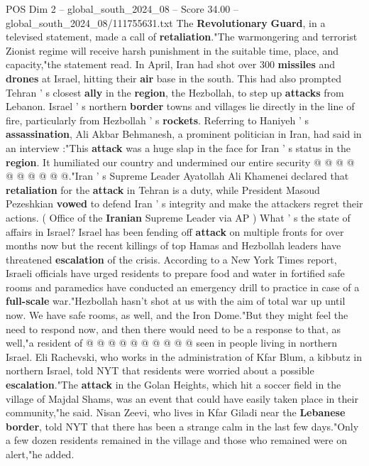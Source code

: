 \begin{textsample}{POS Dim 2 – global\_south\_2024\_08 – Score 34.00 – global\_south\_2024\_08/111755631.txt}
The \textbf{Revolutionary} \textbf{Guard}, in a televised statement, made a call of \textbf{retaliation}."The warmongering and terrorist Zionist regime will receive harsh punishment in the suitable time, place, and capacity,"the statement read.
In April, Iran had shot over 300 \textbf{missiles} and \textbf{drones} at Israel, hitting their \textbf{air} base in the south.
This had also prompted Tehran ' s closest \textbf{ally} in the \textbf{region}, the Hezbollah, to step up \textbf{attacks} from Lebanon.
Israel ' s northern \textbf{border} towns and villages lie directly in the line of fire, particularly from Hezbollah ' s \textbf{rockets}.
Referring to Haniyeh ' s \textbf{assassination}, Ali Akbar Behmanesh, a prominent politician in Iran, had said in an interview :"This \textbf{attack} was a huge slap in the face for Iran ' s status in the \textbf{region}.
It humiliated our country and undermined our entire security @ @ @ @ @ @ @ @ @ @."Iran ' s Supreme Leader Ayatollah Ali Khamenei declared that \textbf{retaliation} for the \textbf{attack} in Tehran is a duty, while President Masoud Pezeshkian \textbf{vowed} to defend Iran ' s integrity and make the attackers regret their actions. ( Office of the \textbf{Iranian} Supreme Leader via AP ) What ' s the state of affairs in Israel?
Israel has been fending off \textbf{attack} on multiple fronts for over months now but the recent killings of top Hamas and Hezbollah leaders have threatened \textbf{escalation} of the crisis.
According to a New York Times report, Israeli officials have urged residents to prepare food and water in fortified safe rooms and paramedics have conducted an emergency drill to practice in case of a \textbf{full-scale} war."Hezbollah hasn't shot at us with the aim of total war up until now.
We have safe rooms, as well, and the Iron Dome."But they might feel the need to respond now, and then there would need to be a response to that, as well,"a resident of @ @ @ @ @ @ @ @ @ @ seen in people living in northern Israel.
Eli Rachevski, who works in the administration of Kfar Blum, a kibbutz in northern Israel, told NYT that residents were worried about a possible \textbf{escalation}."The \textbf{attack} in the Golan Heights, which hit a soccer field in the village of Majdal Shams, was an event that could have easily taken place in their community,"he said.
Nisan Zeevi, who lives in Kfar Giladi near the \textbf{Lebanese} \textbf{border}, told NYT that there has been a strange calm in the last few days."Only a few dozen residents remained in the village and those who remained were on alert,"he added.

\end{textsample}
